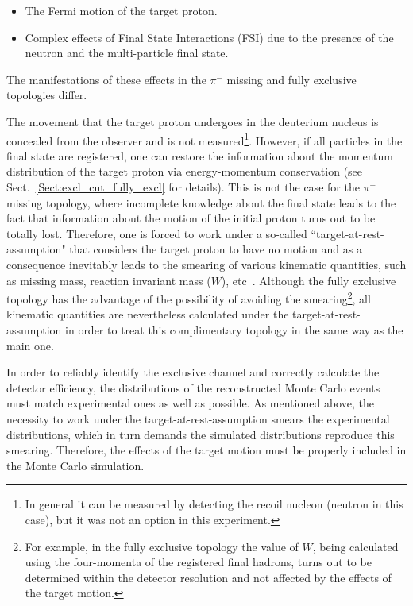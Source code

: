 \begin{itemize}
\item  The Fermi motion of the target proton.%
\item Complex effects of Final State Interactions (FSI) due to the presence of the neutron and the multi-particle final state.
\end{itemize}%

The manifestations of these effects in the $\pi^{-}$ missing and fully exclusive topologies differ.

The movement that the target proton undergoes in the deuterium nucleus is concealed from the observer and is not measured\footnote[10]{In general it can be measured by detecting the recoil nucleon (neutron in this case), but it was not an option in this experiment.}. However, if all particles in the final state are registered, one can restore the information about the momentum distribution of the target proton via energy-momentum conservation (see Sect.~\ref{Sect:excl_cut_fully_excl} for details). This is not the case for the $\pi^{-}$ missing topology, where incomplete knowledge about the final state leads to the fact that information about the motion of the initial proton turns out to be totally lost. Therefore, one is forced to work under a so-called ``target-at-rest-assumption" that considers the target proton to have no motion and as a consequence inevitably leads to the smearing of various kinematic quantities, such as missing mass, reaction invariant mass ($W$), etc~\cite{Skorodumina:2015rea}. 
Although the fully exclusive topology has the advantage of the possibility of avoiding the smearing\footnote[11]{For example, in the fully exclusive topology the value of $W$, being calculated using the four-momenta of the registered final hadrons, turns out to be determined within the detector resolution and not affected by the effects of the target motion.}, all kinematic quantities are nevertheless calculated under the target-at-rest-assumption in order to treat this complimentary topology in the same way as the main one.


In order to reliably identify the exclusive channel and correctly calculate the detector efficiency, the distributions of the reconstructed Monte Carlo events must match experimental ones as well as possible. As mentioned above, the necessity to work under the target-at-rest-assumption smears the experimental distributions, which in turn demands the simulated distributions reproduce this smearing. Therefore, the effects of the target motion must be properly included in the Monte Carlo simulation.


